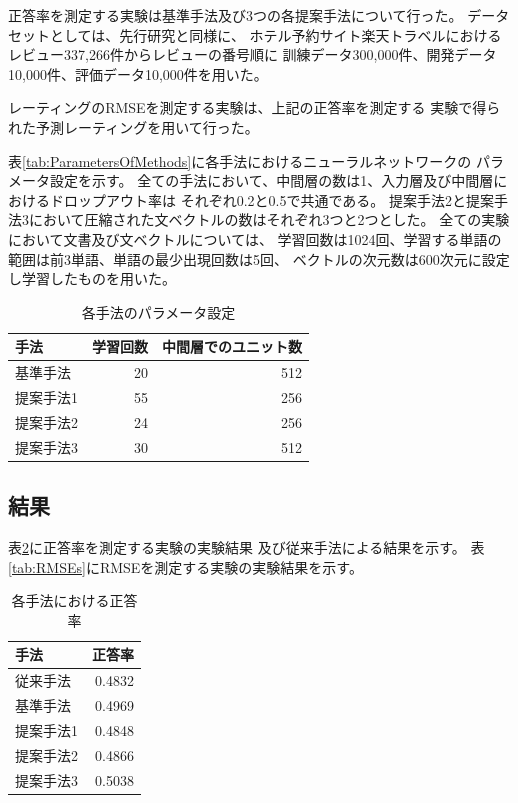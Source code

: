 \documentclass[twocolumn,a4paper]{ltjarticle}
\begin{document}
正答率を測定する実験は基準手法及び3つの各提案手法について行った。
データセットとしては、先行研究\cite{fujitani15}と同様に、
ホテル予約サイト楽天トラベルにおけるレビュー337,266件からレビューの番号順に
訓練データ300,000件、開発データ10,000件、評価データ10,000件を用いた。

レーティングのRMSEを測定する実験は、上記の正答率を測定する
実験で得られた予測レーティングを用いて行った。

表\ref{tab:ParametersOfMethods}に各手法におけるニューラルネットワークの
パラメータ設定を示す。
全ての手法において、中間層の数は1、入力層及び中間層におけるドロップアウト率は
それぞれ0.2と0.5で共通である。
提案手法2と提案手法3において圧縮された文ベクトルの数はそれぞれ3つと2つとした。
全ての実験において文書及び文ベクトルについては、
学習回数は1024回、学習する単語の範囲は前3単語、単語の最少出現回数は5回、
ベクトルの次元数は600次元に設定し学習したものを用いた。

\begin{table}
  \caption{各手法のパラメータ設定}
  \centering
  \begin{tabular}{l | r r} \label{tab:ParametersOfBaselineMethod}
    手法 & 学習回数 & 中間層でのユニット数 \\
    \hline
    基準手法  & 20 & 512 \\
    提案手法1 & 55 & 256 \\
    提案手法2 & 24 & 256 \\
    提案手法3 & 30 & 512 \\
  \end{tabular}
\end{table}


\subsection{結果}

表\ref{tab:Accuracies}に正答率を測定する実験の実験結果
及び従来手法\cite{fujitani15}による結果を示す。
表\ref{tab:RMSEs}にRMSEを測定する実験の実験結果を示す。

\begin{table}
  \caption{各手法における正答率}
  \centering
  \begin{tabular}{l | r} \label{tab:Accuracies}
    手法 & 正答率 \\
    \hline
    従来手法\cite{fujitani15}  & 0.4832 \\
    基準手法  & 0.4969 \\
    提案手法1 & 0.4848 \\
    提案手法2 & 0.4866 \\
    提案手法3 & 0.5038 \\
  \end{tabular}
\end{table}
\end{document}
